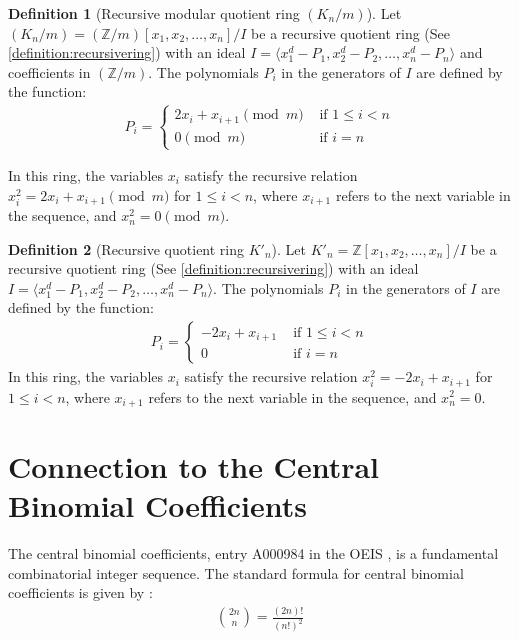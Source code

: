 \documentclass{article}
\theoremstyle{plain}
\theoremstyle{definition}
\newtheorem{definition}{Definition}
\newcommand{\Z}{\mathbb{Z}}
\newcommand{\K}{K}
\begin{document}
\begin{definition}[Recursive modular quotient ring $(\K_n/m)$] \label{definition:modring}
Let $(\K_n/m) = (\Z/m)[x_1, x_2, \ldots, x_n]/I$ be a recursive quotient ring (See \cref{definition:recursivering}) with an ideal \( I = \langle x_1^d - P_1, x_2^d - P_2, \ldots, x_n^d - P_n \rangle \) and coefficients in $(\Z/m)$. The polynomials $P_i$ in the generators of $I$ are defined by the function: 
\begin{align}
P_i =
\begin{cases}
    2x_i + x_{i+1} \pmod{m} & \text{ if } 1 \leq i < n \\
    0 \pmod{m} &\text{ if } i = n
\end{cases}
\end{align}

In this ring, the variables $x_i$ satisfy the recursive relation $x_i^2 = 2x_i + x_{i+1} \pmod{m}$ for $1 \leq i < n$, where $x_{i+1}$ refers to the next variable in the sequence, and $x_n^2 = 0 \pmod{m}$.
\end{definition}

\begin{definition}[Recursive quotient ring $\K'_n$] \label{definition:ring2}
Let $\K'_n = \Z[x_1, x_2, \ldots, x_n]/I$ be a recursive quotient ring (See \cref{definition:recursivering}) with an ideal \( I = \langle x_1^d - P_1, x_2^d - P_2, \ldots, x_n^d - P_n \rangle \). The polynomials $P_i$ in the generators of $I$ are defined by the function: 
\begin{align}
P_i =
\begin{cases}
    -2x_i + x_{i+1} & \text{ if } 1 \leq i < n \\
    0 &\text{ if } i = n
\end{cases}
\end{align}
In this ring, the variables $x_i$ satisfy the recursive relation $x_i^2 = -2x_i + x_{i+1}$ for $1 \leq i < n$, where $x_{i+1}$ refers to the next variable in the sequence, and $x_n^2 = 0$.
\end{definition}

\section{Connection to the Central Binomial Coefficients} 
The central binomial coefficients, entry A000984 in the OEIS \cite{A000984}, is a fundamental combinatorial integer sequence. The standard formula for central binomial coefficients is given by \cite{A000984}:
\begin{align}
    \binom{2n}{n} = \frac{(2n)!}{(n!)^2} 
\end{align}
\end{document}
